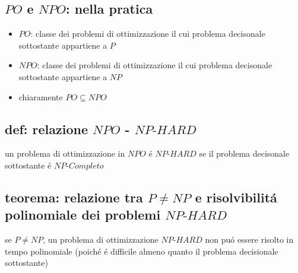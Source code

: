 
\subsection*{$PO$ e $NPO$: nella pratica}
\begin{flushleft}
	\begin{itemize}
		\item $PO$: classe dei problemi di ottimizzazione il cui problema decisonale sottostante appartiene a $P$
		\item $NPO$: classe dei problemi di ottimizzazione il cui problema decisonale sottostante appartiene a $NP$
		\item chiaramente $PO\subseteq NPO$
	\end{itemize}
\end{flushleft}


\subsection*{def: relazione $NPO$ - $NP\text{-}HARD$}
\begin{flushleft}
	un problema di ottimizzazione in $NPO$ \'e $NP\text{-}HARD$ se il problema decisonale sottostante \'e $NP\text{-}Completo$
\end{flushleft}


\subsection*{teorema: relazione tra $P\neq NP$ e risolvibilit\'a polinomiale dei problemi $NP\text{-}HARD$}
\begin{flushleft}
	se $P\neq NP$, un problema di ottimizzazione $NP\text{-}HARD$ non pu\'o essere risolto in tempo polinomiale (poich\'e \'e difficile almeno quanto il problema decisionale sottostante)
\end{flushleft}


